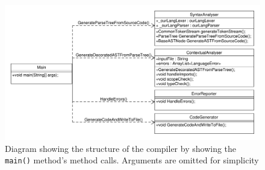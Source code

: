 \begin{figure}[!ht]
	\begin{sideways}
		\begin{minipage}{18cm}
			\includegraphics[height=0.42\textheight]{figures/ClassDiagrams/DiagramOfCallsFromMain.pdf}
		\end{minipage}
	\end{sideways}
	\centering
	\caption{Diagram showing the structure of the compiler by showing the \texttt{main()} method's method calls. Arguments are omitted for simplicity}\label{fig:compilerOverview}
\end{figure}

\clearpage



